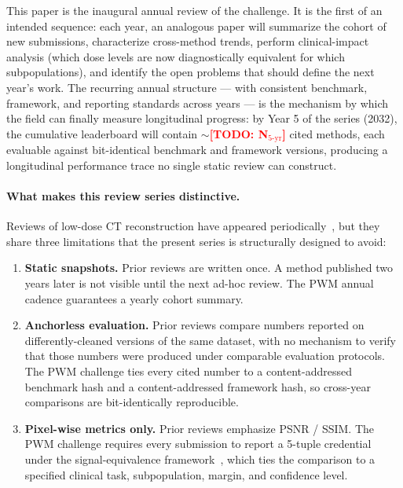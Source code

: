 \documentclass[twoside,11pt]{article}
\newcommand{\todo}[1]{\textcolor{red}{\textbf{[TODO: #1]}}}
\begin{document}
This paper is the inaugural annual review of the challenge. It is the first of an intended sequence: each year, an analogous paper will summarize the cohort of new submissions, characterize cross-method trends, perform clinical-impact analysis (which dose levels are now diagnostically equivalent for which subpopulations), and identify the open problems that should define the next year's work. The recurring annual structure --- with consistent benchmark, framework, and reporting standards across years --- is the mechanism by which the field can finally measure longitudinal progress: by Year 5 of the series (2032), the cumulative leaderboard will contain $\sim$\todo{N$_{\textrm{5-yr}}$} cited methods, each evaluable against bit-identical benchmark and framework versions, producing a longitudinal performance trace no single static review can construct.

\paragraph{What makes this review series distinctive.} Reviews of low-dose CT reconstruction have appeared periodically~\citep{wang2020deeplearningreview}, but they share three limitations that the present series is structurally designed to avoid:

\begin{enumerate}
    \item \textbf{Static snapshots.} Prior reviews are written once. A method published two years later is not visible until the next ad-hoc review. The PWM annual cadence guarantees a yearly cohort summary.
    \item \textbf{Anchorless evaluation.} Prior reviews compare numbers reported on differently-cleaned versions of the same dataset, with no mechanism to verify that those numbers were produced under comparable evaluation protocols. The PWM challenge ties every cited number to a content-addressed benchmark hash and a content-addressed framework hash, so cross-year comparisons are bit-identically reproducible.
    \item \textbf{Pixel-wise metrics only.} Prior reviews emphasize PSNR / SSIM. The PWM challenge requires every submission to report a 5-tuple credential under the signal-equivalence framework~\citep{ws2framework}, which ties the comparison to a specified clinical task, subpopulation, margin, and confidence level.
\end{enumerate}
\end{document}
